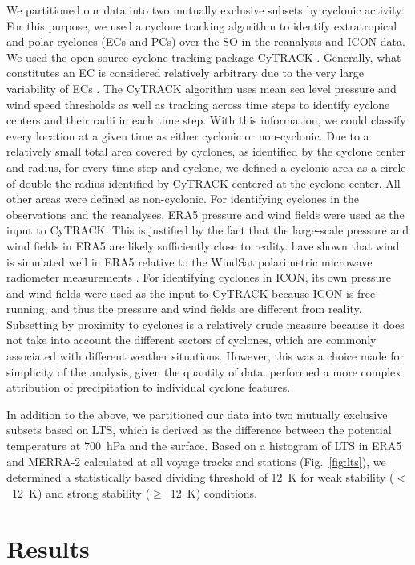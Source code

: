 \documentclass[draft]{agujournal2019}
\begin{document}
We partitioned our data into two mutually exclusive subsets by cyclonic activity. For this purpose, we used a cyclone tracking algorithm to identify extratropical and polar cyclones (ECs and PCs) over the SO in the reanalysis and ICON data. We used the open-source cyclone tracking package CyTRACK \cite{perez-alarcon2024}. Generally, what constitutes an EC is considered relatively arbitrary due to the very large variability of ECs \cite{neu2013}. The CyTRACK algorithm uses mean sea level pressure and wind speed thresholds as well as tracking across time steps to identify cyclone centers and their radii in each time step. With this information, we could classify every location at a given time as either cyclonic or non-cyclonic. Due to a relatively small total area covered by cyclones, as identified by the cyclone center and radius, for every time step and cyclone, we defined a cyclonic area as a circle of double the radius identified by CyTRACK centered at the cyclone center. All other areas were defined as non-cyclonic. For identifying cyclones in the observations and the reanalyses, ERA5 pressure and wind fields were used as the input to CyTRACK. This is justified by the fact that the large-scale pressure and wind fields in ERA5 are likely sufficiently close to reality.  have shown that wind is simulated well in ERA5 relative to the WindSat polarimetric microwave radiometer measurements \cite{meissner2009}. For identifying cyclones in ICON, its own pressure and wind fields were used as the input to CyTRACK because ICON is free-running, and thus the pressure and wind fields are different from reality. Subsetting by proximity to cyclones is a relatively crude measure because it does not take into account the different sectors of cyclones, which are commonly associated with different weather situations. However, this was a choice made for simplicity of the analysis, given the quantity of data.  performed a more complex attribution of precipitation to individual cyclone features.

In addition to the above, we partitioned our data into two mutually exclusive subsets based on LTS, which is derived as the difference between the potential temperature at 700~hPa and the surface. Based on a histogram of LTS in ERA5 and MERRA-2 calculated at all voyage tracks and stations (Fig.~\ref{fig:lts}), we determined a statistically based dividing threshold of 12~K for weak stability ($<$~12~K) and strong stability ($\geq$~12~K) conditions.

\section{Results}
\label{sec:results}
\end{document}
